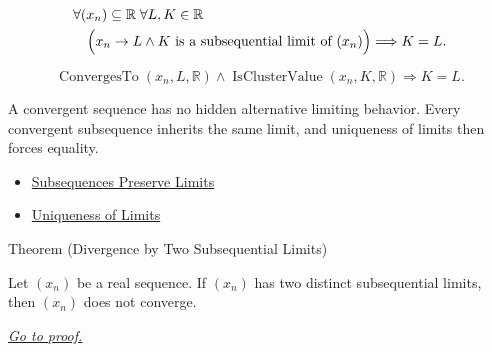 \begin{remark*}
\[
\begin{aligned}
&\forall (x_n)\subseteq\mathbb{R}\;\forall L,K\in\mathbb{R}\\
&\quad\Bigl(
  x_n\to L
  \land
  K\text{ is a subsequential limit of }(x_n)
\Bigr)
\Longrightarrow
K=L.
\end{aligned}
\]
\end{remark*}

\begin{remark*}
\[
\operatorname{ConvergesTo}(x_n,L,\mathbb{R})
\land
\operatorname{IsClusterValue}(x_n,K,\mathbb{R})
\Longrightarrow
K=L.
\]
\end{remark*}

\begin{remark*}[Interpretation]
A convergent sequence has no hidden alternative limiting behavior. Every
convergent subsequence inherits the same limit, and uniqueness of limits then
forces equality.
\end{remark*}

\begin{dependencies}
\begin{itemize}
  \item \hyperref[thm:subsequences-preserve-limits]{Subsequences Preserve Limits}
  \item \hyperref[thm:uniqueness-of-limits]{Uniqueness of Limits}
\end{itemize}
\end{dependencies}


\begin{theorembox}{Theorem (Divergence by Two Subsequential Limits)}
\begin{theorem}
\label{thm:divergence-by-two-subsequential-limits}
Let $(x_n)$ be a real sequence. If $(x_n)$ has two distinct subsequential
limits, then $(x_n)$ does not converge.

\smallskip
\noindent
\hyperref[prf:divergence-by-two-subsequential-limits]{\textit{Go to proof.}}
\end{theorem}
\end{theorembox}

